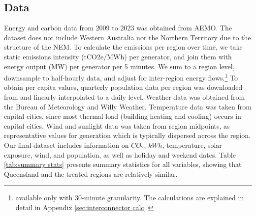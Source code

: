\subsection{Data}
\label{sec:data}

Energy and carbon data from 2009 to 2023 was obtained from \ac{AEMO}\nocite{nemweb, nemweb_mmsdm}. 
The dataset does not include Western Australia nor the Northern Territory due to the structure of the \ac{NEM}.
To calculate the emissions per region over time, we take static emissions intensity (tCO2e/MWh) per generator, and join them with energy output (MW) per generator per 5 minutes. We sum to a region level, downsample to half-hourly data, and adjust for inter-region energy flows.\footnote{available only with 30-minute granularity. The calculations are explained in detail in Appendix \ref{sec:interconnector calc}.}
To obtain per capita values, 
quarterly population data per region was downloaded from \citeauthor{abs_population} and linearly interpolated to a daily level.
Weather data was obtained from the Bureau of Meteorology\nocite{weather_data} and Willy Weather\nocite{willy_weather}. Temperature data was taken from capital cities, since most thermal load (building heating and cooling) occurs in capital cities. Wind and sunlight data was taken from region midpoints, as representative values for generation which is typically dispersed across the region. Our final dataset includes information on $CO_2$, $kWh$, temperature, solar exposure, wind, and population, as well as holiday and weekend dates. Table \ref{tab:summary stats} presents summary statistics for all variables, showing that Queensland and the treated regions are relatively similar.  
